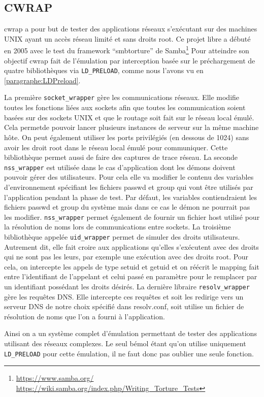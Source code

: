 \subsection{CWRAP}
\label{subsection:cwrap}

cwrap\citep{cwrap, cwrap_bis} a pour but de tester des applications réseaux s'exécutant sur des machines UNIX ayant un accès réseau limité et sans droits root. Ce projet libre a débuté en 2005 avec le test du framework ``smbtorture'' de Samba\footnote{\url{https://www.samba.org/} \\ \url{https://wiki.samba.org/index.php/Writing\_Torture\_Tests}} Pour atteindre son objectif cwrap fait de l'émulation par interception basée sur le préchargement de quatre bibliothèques via \texttt{LD\_PRELOAD}, comme nous l'avons vu en \ref{paragraphe:LDPreload}.

La première \texttt{socket\_wrapper} gère les communications réseaux. Elle modifie toutes les fonctions liées aux sockets afin que toutes les communication soient basées sur des sockets UNIX et que le routage soit fait sur le réseau local émulé. Cela permetde pouvoir lancer plusieurs instances de serveur sur la même machine hôte. On peut également utiliser les ports privilégiés (en dessous de 1024) sans avoir les droit root dans le réseau local émulé pour communiquer. Cette bibliothèque permet aussi de faire des captures de trace réseau. La seconde \texttt{nss\_wrapper} est utilisée dans le cas d'application dont les démons doivent pouvoir gérer des utilisateurs. Pour cela elle va modifier le contenu des variables d'environnement spécifiant les fichiers passwd et group qui vont être utilisés par l'application pendant la phase de test. Par défaut, les variables contiendraient les fichiers passwd et group du système mais dans ce cas le démon ne pourrait pas les modifier. \texttt{nss\_wrapper} permet également de fournir un fichier host utilisé pour la résolution de noms lors de communications entre sockets. La troisième bibliothèque appelée \texttt{uid\_wrapper} permet de simuler des droits utilisateurs. Autrement dit, elle fait croire aux applications qu'elles s'exécutent avec des droits qui ne sont pas les leurs, par exemple une exécution avec des droits root. Pour cela, on intercepte les appels de type setuid et getuid et on réécrit le mapping fait entre l'identifiant de l'appelant et celui passé en paramètre pour le remplacer par un identifiant possédant les droits désirés. La dernière libraire \texttt{resolv\_wrapper} gère les requêtes DNS. Elle intercepte ces requêtes et soit les redirige vers un serveur DNS de notre choix spécifié dans resolv.conf, soit utilise un fichier de résolution de noms que l'on a fourni à l'application.

Ainsi on a un système complet d'émulation permettant de tester des applications utilisant des réseaux complexes. Le seul bémol étant qu'on utilise uniquement \texttt{LD\_PRELOAD} pour cette émulation, il ne faut donc pas oublier une seule fonction.




